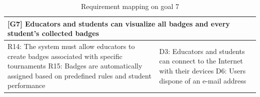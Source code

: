 \begin{table}[H]
    \centering
    \begin{tabular}{|p{8cm}|p{8cm}|}
    \hline
        \multicolumn{2}{|p{16cm}|}{\textbf{[G7] Educators and students can visualize all badges and every student’s collected badges}} \\
    \hline
        R14: The system must allow educators to create badges associated with specific tournaments \newline
        R15: Badges are automatically assigned based on predefined rules and student performance \newline
        &
        D3: Educators and students can connect to the Internet with their devices \newline 
        D6: Users dispone of an e-mail address \\
    \hline
    \end{tabular}
    \caption{Requirement mapping on goal 7}
    \label{tab:g7}
\end{table}

\newpage

